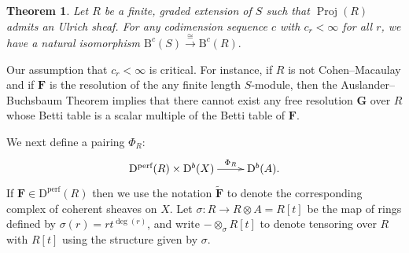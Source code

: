 \documentclass[12pt]{amsart}
\newtheorem{thm}[lemma]{Theorem}
\theoremstyle{definition}
\theoremstyle{remark}
\newcommand{\Proj}{\operatorname{Proj}}
\newcommand{\cc}{c}
\newcommand{\FF}{\mathbf{F}}
\newcommand{\Gbull}{\mathbf{G}}
\newcommand{\DD}{\mathrm{D}}
\newcommand{\BBQ}{\mathrm{B}}
\begin{document}

\begin{thm}\label{cor:new graded rings}
Let $R$ be a finite, graded extension of $S$ such that $\Proj(R)$ admits an Ulrich sheaf.  For any codimension sequence $\cc$ with $\cc_r<\infty$ for all $r$, we have  a natural isomorphism
$
\BBQ^{\cc}(S)\overset{\cong}{\to} \BBQ^{\cc}(R).
$
\end{thm}
Our assumption that $c_r<\infty$ is critical.  For instance, if $R$ is not Cohen--Macaulay and if $\FF$ is the resolution of the any finite length $S$-module, then the Auslander--Buchsbaum Theorem implies that there cannot exist any free resolution $\Gbull$ over $R$ whose Betti table is a scalar multiple of the Betti table of $\FF$.

We next define a pairing $\Phi_{R}$:
\[
\xymatrix{\DD^{\text{perf}}(R)\times \DD^{b}(X)  \ar[r]^-{\Phi_{R}}&\DD^{b}(A).}
\]
If $\FF \in \DD^{\text{perf}}(R)$ then we use the notation $\widetilde{\FF}$ to denote the corresponding complex of coherent sheaves on $X$.
Let $\sigma: R\to R\otimes A=R[t]$ be the map of rings defined by $\sigma(r)=rt^{\deg(r)}$, and
write $-\otimes_\sigma R[t]$ to denote tensoring over $R$ with $R[t]$ using the structure
given by $\sigma$. 
\end{document}
